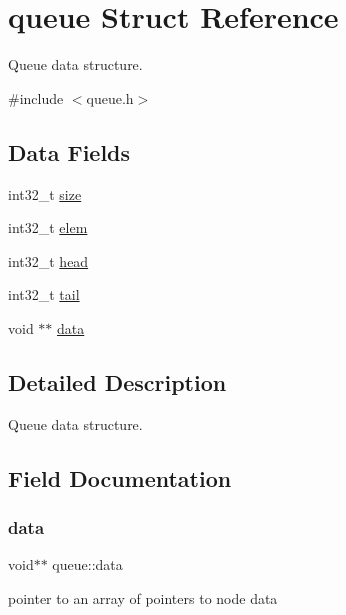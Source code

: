 \hypertarget{structqueue}{}\section{queue Struct Reference}
\label{structqueue}


Queue data structure.  




{\ttfamily \#include $<$queue.\+h$>$}

\subsection*{Data Fields}
\begin{DoxyCompactItemize}
\item 
int32\+\_\+t \hyperlink{structqueue_af80cfabc36286195365b6d666d518504}{size}
\item 
int32\+\_\+t \hyperlink{structqueue_a187a42d061b48da53e894181758d558d}{elem}
\item 
int32\+\_\+t \hyperlink{structqueue_aec96f7889213946d685f28a0d6504428}{head}
\item 
int32\+\_\+t \hyperlink{structqueue_ada0fe9a078df1d07623c761f2e8376ad}{tail}
\item 
void $\ast$$\ast$ \hyperlink{structqueue_a794929032d575599c02f795cea4b3118}{data}
\end{DoxyCompactItemize}


\subsection{Detailed Description}
Queue data structure. 

\subsection{Field Documentation}
\mbox{\label{structqueue_a794929032d575599c02f795cea4b3118}} 
\subsubsection{\texorpdfstring{data}{data}}
{\footnotesize\ttfamily void$\ast$$\ast$ queue\+::data}

pointer to an array of pointers to node data \mbox{\label{structqueue_a187a42d061b48da53e894181758d558d}} 
